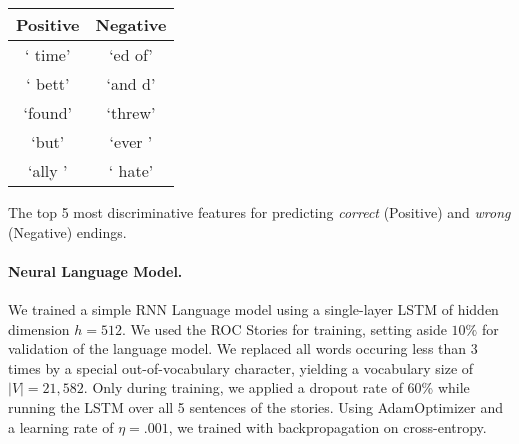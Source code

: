 \documentclass[11pt,a4paper]{article}
\newcommand{\ms}[1]{{\color{cyan}\{\textit{#1}\}$_{ms}$}}
\newcommand{\roy}[1]{\footnote{\color{red}{\textbf{Roy: #1}}}}
\renewcommand{\ms}[1]{}
\renewcommand{\roy}[1]{}
\begin{document}
\begin{table}[!t]
\begin{center}
\small
\begin{tabular}{|c|c|} \hline
{\bf Positive} & {\bf Negative}\\ \hline
` time' & `ed of'\\ \hline
` bett' & `and d'\\ \hline
`found' & `threw'\\ \hline
`but' & `ever '\\ \hline
`ally ' & ` hate'\\ \hline

\end{tabular}
\end{center}
\caption{\label{features}}
The top 5 most discriminative features for predicting {\it correct} (Positive)  and {\it wrong} (Negative) endings.\end{table}



\paragraph{Neural Language Model.}
\ms{Below is a messy dump of all the hyper parameters... Didn't know how many details were needed}\roy{The level of description seems fine (we might remove some of them if space is an issue, but for now it's good. What I'm missing here are (a) an introductory 1-2  sentences to what are we doing here (I realize that it is not 100\% clear from the intro what is the role of these experiments other than showing that we have STOA results, so this can come later\\
(b) A one-sentence description of your model. Currently, there is no clear separation between the model (RNN using LSTM) and the technical details. 
Some general description of the model, and specifically the motivation behind (nothing fancy, just saying that we applied state-of-the-art LM tools, 
which resemble the tools the authors had in mind when they designed the task).}

We trained a simple RNN Language model \cite{mikolov2010recurrent} using a single-layer LSTM \cite{hochreiter1997long} of hidden dimension $h=512$.
We used the ROC Stories for training, setting aside $10\%$ for validation of the language model. We replaced all words occuring less than 3 times by a special out-of-vocabulary character, yielding a vocabulary size of $|V|=21,582$.
Only during training, we applied a dropout rate of 60\% while running the LSTM over all 5 sentences of the stories. Using AdamOptimizer \cite{kingma2014adam} and a learning rate of $\eta=.001$, we trained with backpropagation on cross-entropy. %
\end{document}
